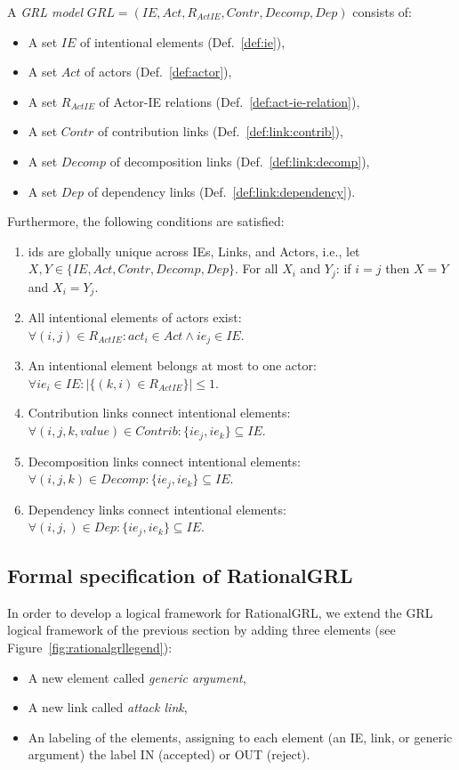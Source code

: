 \begin{definition}
\label{def:grl-model}
A \emph{GRL model} $GRL=(IE, Act, R_{ActIE}, Contr, Decomp, Dep)$ consists of:
\begin{itemize}
\item A set $IE$ of intentional elements (Def.~\ref{def:ie}),
\item A set $Act$ of actors (Def.~\ref{def:actor}),
\item A set $R_{ActIE}$ of Actor-IE relations (Def.~\ref{def:act-ie-relation}),
\item A set $Contr$ of contribution links (Def.~\ref{def:link:contrib}),
\item A set $Decomp$ of decomposition links (Def.~\ref{def:link:decomp}),
\item A set $Dep$ of dependency links (Def.~\ref{def:link:dependency}).
\end{itemize}

Furthermore, the following conditions are satisfied:
\begin{enumerate}
\item ids are globally unique across IEs, Links, and Actors, i.e., let $X,Y\in \{IE,Act, Contr, Decomp, Dep\}$. For all $X_i$ and $Y_j$: if $i=j$ then $X=Y$ and $X_i=Y_j$.
\item All intentional elements of actors exist: $\forall (i,j)\in R_{ActIE}: act_i \in Act \wedge ie_j \in IE$.
\item An intentional element belongs at most to one actor: $\forall ie_i\in IE: |\{(k,i)\in R_{ActIE}\}| \le 1$.
\item Contribution links connect intentional elements: $\forall (i,j,k,value)\in Contrib: \{ie_j,ie_k\}\subseteq IE$.
\item Decomposition links connect intentional elements: $\forall (i,j,k)\in Decomp: \{ie_j,ie_k\}\subseteq IE$.
\item Dependency links connect intentional elements: $\forall (i,j,)\in Dep: \{ie_j,ie_k\}\subseteq IE$.
\end{enumerate}
\end{definition}


\subsection{Formal specification of RationalGRL}

In order to develop a logical framework for RationalGRL, we extend the GRL logical framework of the previous section by adding three elements (see Figure~\ref{fig:rationalgrllegend}):
\begin{itemize}
\item A new element called \emph{generic argument},
\item A new link called \emph{attack link},
\item An labeling of the elements, assigning to each element (an IE, link, or generic argument) the label IN (accepted) or OUT (reject).
\end{itemize}


